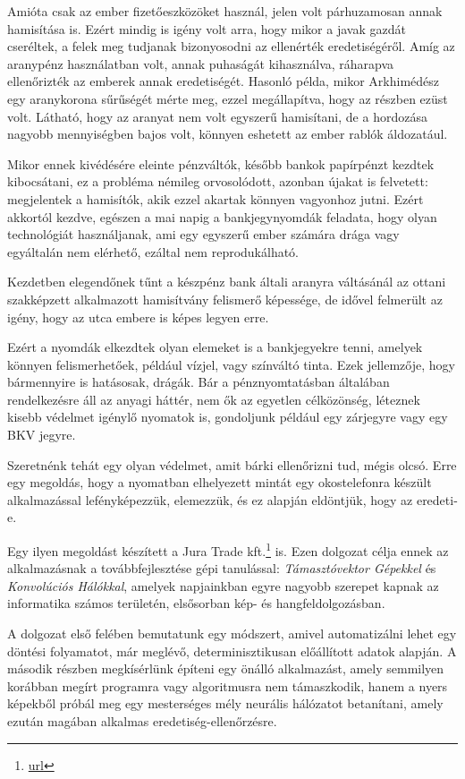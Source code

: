 Amióta csak az ember fizetőeszközöket használ, jelen volt párhuzamosan annak hamisítása is.
Ezért mindig is igény volt arra, hogy mikor a javak gazdát cseréltek, a felek meg tudjanak 
bizonyosodni az ellenérték eredetiségéről. Amíg az aranypénz használatban volt, annak puhaságát 
kihasználva, ráharapva ellenőrizték az emberek annak eredetiségét. Hasonló példa, 
mikor Arkhimédész egy aranykorona sűrűségét mérte meg, ezzel megállapítva, hogy az részben ezüst
volt. Látható, hogy az aranyat nem volt egyszerű hamisítani, de a hordozása nagyobb 
mennyiségben bajos volt, könnyen eshetett az ember rablók áldozatául.

Mikor ennek kivédésére eleinte pénzváltók, később bankok papírpénzt kezdtek kibocsátani, ez a probléma némileg orvosolódott,
azonban újakat is felvetett: megjelentek a hamisítók, akik ezzel akartak könnyen vagyonhoz jutni.
Ezért akkortól kezdve, egészen a mai napig a bankjegynyomdák feladata, hogy olyan
technológiát használjanak, ami egy egyszerű ember számára drága vagy egyáltalán nem elérhető,
ezáltal nem reprodukálható.

Kezdetben elegendőnek tűnt a készpénz bank általi aranyra váltásánál az ottani szakképzett 
alkalmazott hamisítvány felismerő képessége,  de idővel felmerült az igény, hogy az utca embere
is képes legyen erre.

Ezért a nyomdák elkezdtek olyan elemeket is a bankjegyekre tenni, amelyek könnyen felismerhetőek,
például vízjel, vagy színváltó tinta. Ezek jellemzője, hogy bármennyire is hatásosak, drágák.
Bár a pénznyomtatásban általában rendelkezésre áll az anyagi háttér, nem ők az egyetlen
célközönség, léteznek kisebb védelmet igénylő nyomatok is, gondoljunk például egy 
zárjegyre vagy egy BKV jegyre.

Szeretnénk tehát egy olyan védelmet, amit bárki ellenőrizni tud, mégis olcsó. Erre egy megoldás,
hogy a nyomatban elhelyezett mintát egy okostelefonra készült alkalmazással lefényképezzük,
elemezzük, és ez alapján eldöntjük, hogy az eredeti-e.


Egy ilyen megoldást készített a Jura Trade kft.\footnote{\url{url}} is. Ezen dolgozat célja ennek az alkalmazásnak
a továbbfejlesztése gépi tanulással: \textit{Támasztóvektor Gépekkel} és \textit{Konvolúciós Hálókkal},
amelyek napjainkban egyre nagyobb szerepet kapnak az informatika számos területén, elsősorban kép- és hangfeldolgozásban. 

A dolgozat első felében bemutatunk egy módszert, amivel automatizálni lehet egy döntési folyamatot, már 
meglévő, determinisztikusan előállított adatok alapján. A második részben megkísérlünk építeni egy 
önálló alkalmazást, amely semmilyen korábban megírt programra vagy algoritmusra 
nem támaszkodik, hanem a nyers képekből próbál meg egy mesterséges mély neurális hálózatot betanítani, 
amely ezután magában alkalmas eredetiség-ellenőrzésre.


